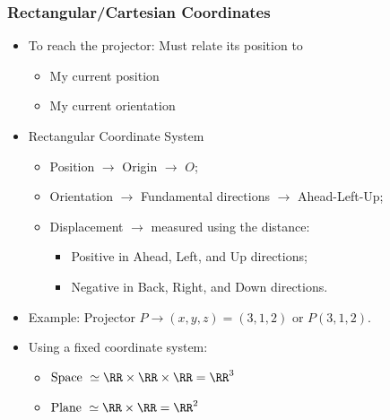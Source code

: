 \begin{frame}
 \frametitle{Rectangular/Cartesian Coordinates}

 \begin{itemize}
  \item To reach the projector: \pause Must relate its position to
      \begin{itemize}
	\item My current position
	\item My current orientation
      \end{itemize}

  \item<3-> Rectangular Coordinate System
      \begin{itemize}
	\item Position $\to$ Origin $\to$ $O$;
	\item Orientation $\to$ Fundamental directions $\to$ Ahead-Left-Up;
	\item Displacement $\to$ measured using the distance:
	    \begin{itemize}
	      \item Positive in Ahead, Left, and Up directions;
	      \item Negative in Back, Right, and Down directions.
	    \end{itemize}
	\end{itemize}

  \item<4-> Example: Projector $P \to (x,y,z) = (3,1,2)$ or $P(3,1,2)$.

  \item<5-> Using a fixed coordinate system:
    \begin{itemize}
      \item $\text{Space } \simeq \RR \times \RR \times \RR = \RR^3$
      \item $\text{Plane } \simeq \RR \times \RR = \RR^2$
    \end{itemize}
 \end{itemize}
\end{frame}

